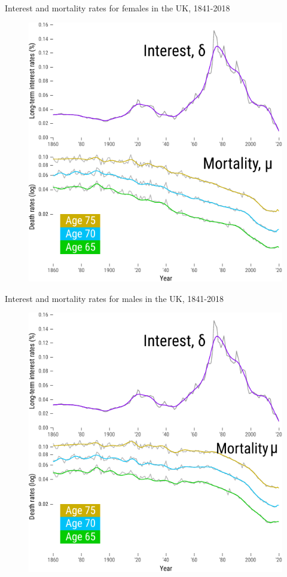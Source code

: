 \documentclass[10pt]{beamer}
\begin{document}
\begin{frame}{Interest and mortality rates for females in the UK, 1841-2018}
\begin{figure}
	\centering
	\hspace*{-0.9cm}
	\includegraphics[scale=0.9] {Fig0.pdf}
\end{figure}
\end{frame}


\begin{frame}{Interest and mortality rates for males in the UK, 1841-2018}
\begin{figure}
	\centering
	\hspace*{-0.9cm}
	\includegraphics[scale=0.9] {Fig0m.pdf}
\end{figure}
\end{frame}
\end{document}
